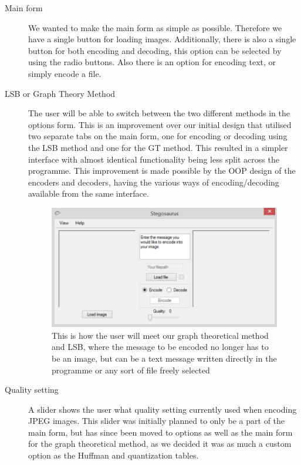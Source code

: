 \begin{description}
\item[Main form]
We wanted to make the main form as simple as possible. Therefore we have a single button for loading images. Additionally, there is also a single button for both encoding and decoding, this option can be selected by using the radio buttons. Also there is an option for encoding text, or simply encode a file.

\item[LSB or Graph Theory Method]
The user will be able to switch between the two different methods in the options form. This is an improvement over our initial design that utilised two separate tabs on the main form, one for encoding or decoding using the LSB method and one for the GT method. This resulted in a simpler interface with almost identical functionality being less split across the programme. This improvement is made possible by the OOP design of the encoders and decoders, having the various ways of encoding/decoding available from the same interface.

\begin{figure}
	\centering
	\includegraphics[width=1\textwidth]{figures/StegoMainForm.png}
	\caption{This is how the user will meet our graph theoretical method and LSB, where the message to be encoded no longer has to be an image, but can be a text message written directly in the programme or any sort of file freely selected}
	\label{fig:StegoMainForm}
\end{figure}

\item[Quality setting]
A slider shows the user what quality setting currently used when encoding JPEG images. 
This slider was initially planned to only be a part of the main form, but has since been moved to options as well as the main form for the graph theoretical method, as we decided it was as much a custom option as the Huffman and quantization tables.


\end{description}
